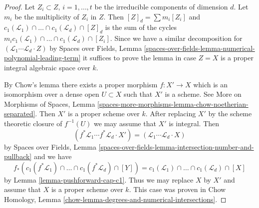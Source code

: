 \documentclass[10pt,a4paper]{amsart}
\theoremstyle{plain}
\theoremstyle{definition}
\theoremstyle{remark}
\numberwithin{equation}{subsection}
\begin{document}
\begin{proof}
Let $Z_i \subset Z$, $i = 1, \ldots, t$ be the irreducible components
of dimension $d$. Let $m_i$ be the multiplicity of $Z_i$ in $Z$. Then
$[Z]_d = \sum m_i[Z_i]$ and
$c_1(\mathcal{L}_1) \cap \ldots \cap c_1(\mathcal{L}_d) \cap [Z]_d$
is the sum of the cycles
$m_i c_1(\mathcal{L}_1) \cap \ldots \cap c_1(\mathcal{L}_d) \cap [Z_i]$.
Since we have a similar decomposition for
$(\mathcal{L}_1 \cdots \mathcal{L}_d \cdot Z)$ by
Spaces over Fields, Lemma
\ref{spaces-over-fields-lemma-numerical-polynomial-leading-term}
it suffices to prove the lemma in case $Z = X$
is a proper integral algebraic space over $k$.

\medskip\noindent
By Chow's lemma there exists a proper morphism $f : X' \to X$
which is an isomorphism over a dense open $U \subset X$
such that $X'$ is a scheme. See More on Morphisms of Spaces, Lemma
\ref{spaces-more-morphisms-lemma-chow-noetherian-separated}.
Then $X'$ is a proper scheme over $k$. After replacing $X'$
by the scheme theoretic closure of $f^{-1}(U)$
we may assume that $X'$ is integral. Then
$$
(f^*\mathcal{L}_1 \cdots f^*\mathcal{L}_d \cdot X') =
(\mathcal{L}_1 \cdots \mathcal{L}_d \cdot X)
$$
by Spaces over Fields, Lemma
\ref{spaces-over-fields-lemma-intersection-number-and-pullback}
and we have
$$
f_*(c_1(f^*\mathcal{L}_1) \cap \ldots \cap c_1(f^*\mathcal{L}_d) \cap [Y]) =
c_1(\mathcal{L}_1) \cap \ldots \cap c_1(\mathcal{L}_d) \cap [X]
$$
by Lemma \ref{lemma-pushforward-cap-c1}. Thus we may replace $X$ by $X'$
and assume that $X$ is a proper scheme over $k$. This case
was proven in Chow Homology, Lemma
\ref{chow-lemma-degrees-and-numerical-intersections}.
\end{proof}
\end{document}
